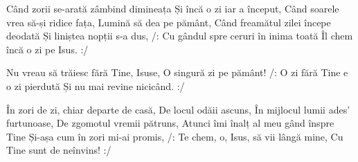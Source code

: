 \beginverse
Când zorii se-arată zâmbind dimineața
Și încă o zi iar a început,
Când soarele vrea să-și ridice fața,
Lumină să dea pe pământ,
Când freamătul zilei începe deodată
Și liniștea nopții s-a dus,
/: Cu gândul spre ceruri în inima toată
Îl chem încă o zi pe Isus. :/
\endverse

\beginchorus
Nu vreau să trăiesc fără Tine, Isuse,
O singură zi pe pământ!
/: O zi fără Tine e o zi pierdută
Și nu mai revine nicicând. :/
\endchorus

\beginverse
În zori de zi, chiar departe de casă,
De locul odăii ascuns,
În mijlocul lumii ades’ furtunoase,
De zgomotul vremii pătruns,
Atunci îmi înalț al meu gând înspre Tine
Și-așa cum în zori mi-ai promis,
/: Te chem, o, Isus, să vii lângă mine,
Cu Tine sunt de neînvins! :/
\endverse
\endsong